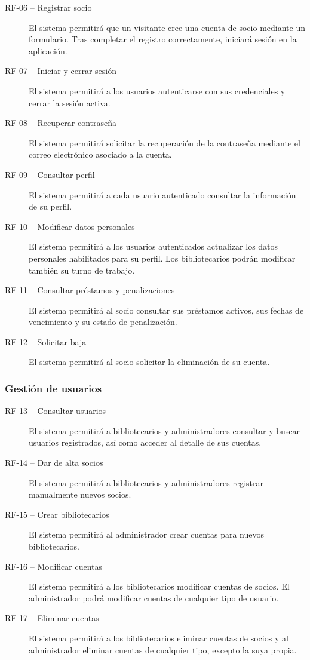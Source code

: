 \begin{description}
	\item[RF-06 -- Registrar socio]
	El sistema permitirá que un visitante cree una cuenta de socio mediante un formulario. Tras completar el registro correctamente, iniciará sesión en la aplicación.
	
	\item[RF-07 -- Iniciar y cerrar sesión]
	El sistema permitirá a los usuarios autenticarse con sus credenciales y	cerrar la sesión activa.
	
	\item[RF-08 -- Recuperar contraseña]
	El sistema permitirá solicitar la recuperación de la contraseña mediante el correo electrónico asociado a la cuenta.
	
	\item[RF-09 -- Consultar perfil]
	El sistema permitirá a cada usuario autenticado consultar la información de su perfil.
	
	\item[RF-10 -- Modificar datos personales]
	El sistema permitirá a los usuarios autenticados actualizar los datos personales habilitados para su perfil. Los bibliotecarios podrán modificar también su turno de trabajo.
	
	\item[RF-11 -- Consultar préstamos y penalizaciones]
	El sistema permitirá al socio consultar sus préstamos activos, sus fechas de vencimiento y su estado de penalización.
	
	\item[RF-12 -- Solicitar baja]
	El sistema permitirá al socio solicitar la eliminación de su cuenta.
\end{description}

\subsubsection{Gestión de usuarios}

\begin{description}
	\item[RF-13 -- Consultar usuarios]
	El sistema permitirá a bibliotecarios y administradores consultar y	buscar usuarios registrados, así como acceder al detalle de sus cuentas.
	
	\item[RF-14 -- Dar de alta socios]
	El sistema permitirá a bibliotecarios y administradores registrar manualmente nuevos socios.
	
	\item[RF-15 -- Crear bibliotecarios]
	El sistema permitirá al administrador crear cuentas para nuevos	bibliotecarios.
	
	\item[RF-16 -- Modificar cuentas]
	El sistema permitirá a los bibliotecarios modificar cuentas de socios. El administrador podrá modificar cuentas de cualquier tipo de usuario.
	
	\item[RF-17 -- Eliminar cuentas]
	El sistema permitirá a los bibliotecarios eliminar cuentas de socios y al administrador eliminar cuentas de cualquier tipo, excepto la suya
	propia.
\end{description}

